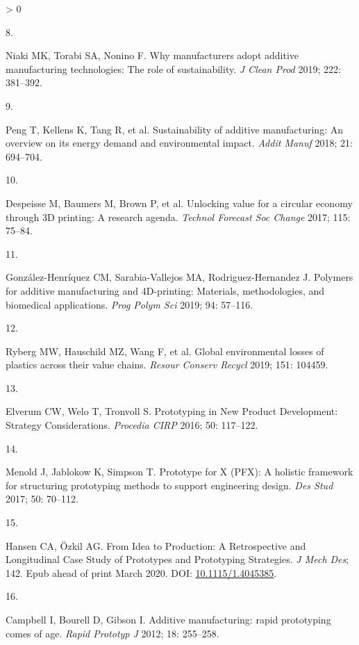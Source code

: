 \documentclass[
  12pt]{article}
\newlength{\cslhangindent}
\newlength{\csllabelwidth}
\newenvironment{CSLReferences}[2] %
 {%
  \setlength{\parindent}{0pt}
  \ifodd #1 \everypar{\setlength{\hangindent}{\cslhangindent}}\ignorespaces\fi
  \ifnum #2 > 0
  \setlength{\parskip}{#2\baselineskip}
  \fi
 }%
 {}
\newcommand{\CSLLeftMargin}[1]{\parbox[t]{\csllabelwidth}{#1}}
\newcommand{\CSLRightInline}[1]{\parbox[t]{\linewidth - \csllabelwidth}{#1}\break}
\begin{document}
\begin{CSLReferences}{0}{0}
\leavevmode\hypertarget{ref-Niaki2019}{}%
\CSLLeftMargin{8. }
\CSLRightInline{Niaki MK, Torabi SA, Nonino F. {Why manufacturers adopt additive manufacturing technologies: The role of sustainability}. \emph{J Clean Prod} 2019; 222: 381--392.}

\leavevmode\hypertarget{ref-Peng2018}{}%
\CSLLeftMargin{9. }
\CSLRightInline{Peng T, Kellens K, Tang R, et al. {Sustainability of additive manufacturing: An overview on its energy demand and environmental impact}. \emph{Addit Manuf} 2018; 21: 694--704.}

\leavevmode\hypertarget{ref-Despeisse2016}{}%
\CSLLeftMargin{10. }
\CSLRightInline{Despeisse M, Baumers M, Brown P, et al. {Unlocking value for a circular economy through 3D printing: A research agenda}. \emph{Technol Forecast Soc Change} 2017; 115: 75--84.}

\leavevmode\hypertarget{ref-GonzalezHenriquez2019}{}%
\CSLLeftMargin{11. }
\CSLRightInline{González-Henríquez CM, Sarabia-Vallejos MA, Rodriguez-Hernandez J. {Polymers for additive manufacturing and 4D-printing: Materials, methodologies, and biomedical applications}. \emph{Prog Polym Sci} 2019; 94: 57--116.}

\leavevmode\hypertarget{ref-Ryberg2019}{}%
\CSLLeftMargin{12. }
\CSLRightInline{Ryberg MW, Hauschild MZ, Wang F, et al. {Global environmental losses of plastics across their value chains}. \emph{Resour Conserv Recycl} 2019; 151: 104459.}

\leavevmode\hypertarget{ref-Elverum2016}{}%
\CSLLeftMargin{13. }
\CSLRightInline{Elverum CW, Welo T, Tronvoll S. {Prototyping in New Product Development: Strategy Considerations}. \emph{Procedia CIRP} 2016; 50: 117--122.}

\leavevmode\hypertarget{ref-Menold2017}{}%
\CSLLeftMargin{14. }
\CSLRightInline{Menold J, Jablokow K, Simpson T. {Prototype for X (PFX): A holistic framework for structuring prototyping methods to support engineering design}. \emph{Des Stud} 2017; 50: 70--112.}

\leavevmode\hypertarget{ref-Hansen2020}{}%
\CSLLeftMargin{15. }
\CSLRightInline{Hansen CA, Özkil AG. {From Idea to Production: A Retrospective and Longitudinal Case Study of Prototypes and Prototyping Strategies}. \emph{J Mech Des}; 142. Epub ahead of print March 2020. DOI: \href{https://doi.org/10.1115/1.4045385}{10.1115/1.4045385}.}

\leavevmode\hypertarget{ref-Campbell2012}{}%
\CSLLeftMargin{16. }
\CSLRightInline{Campbell I, Bourell D, Gibson I. {Additive manufacturing: rapid prototyping comes of age}. \emph{Rapid Prototyp J} 2012; 18: 255--258.}


\end{CSLReferences}
\end{document}
